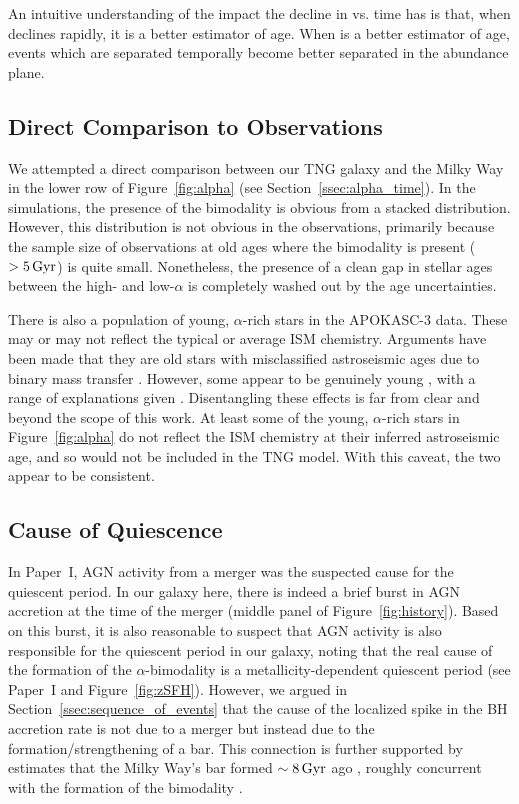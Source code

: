 An intuitive understanding of the impact the decline in \alphaFe{} vs. time has is that, when \alphaFe{} declines rapidly, it is a better estimator of age. When \alphaFe{} is a better estimator of age, events which are separated temporally become better separated in the abundance plane.

\subsection{Direct Comparison to Observations}\label{ssec:compare_obs}
We attempted a direct comparison between our TNG galaxy and the Milky Way in the lower row of Figure~\ref{fig:alpha} (see Section~\ref{ssec:alpha_time}). In the simulations, the presence of the bimodality is obvious from a stacked distribution. However, this distribution is not obvious in the observations, primarily because the sample size of observations at old ages where the bimodality is present ($>5\,\textrm{Gyr}$) is quite small. Nonetheless, the presence of a clean gap in stellar ages between the high- and low-$\alpha$ is completely washed out by the age uncertainties.

There is also a population of young, $\alpha$-rich stars in the APOKASC-3 data. These may or may not reflect the typical or average ISM chemistry. Arguments have been made that they are old stars with misclassified astroseismic ages due to binary mass transfer \citep[and references therein]{2023A&A...671A..21J}. However, some appear to be genuinely young \citep[and references therein]{2024arXiv241002962L}, with a range of explanations given \citep[e.g.][]{2015A&A...576L..12C,2021MNRAS.508.4484J,2023arXiv231105815S}. Disentangling these effects is far from clear and beyond the scope of this work. At least some of the young, $\alpha$-rich stars in Figure~\ref{fig:alpha} do not reflect the ISM chemistry at their inferred astroseismic age, and so would not be included in the TNG model. With this caveat, the two appear to be consistent.

\subsection{Cause of Quiescence}\label{ssec:cause_qui}
In Paper~I, AGN activity from a merger was the suspected cause for the quiescent period. In our galaxy here, there is indeed a brief burst in AGN accretion at the time of the merger (middle panel of Figure~\ref{fig:history}). Based on this burst, it is also reasonable to suspect that AGN activity is also responsible for the quiescent period in our galaxy, noting that the real cause of the formation of the $\alpha$-bimodality is a metallicity-dependent quiescent period (see Paper~I and Figure~\ref{fig:zSFH}). However, we argued in Section~\ref{ssec:sequence_of_events} that the cause of the localized spike in the BH accretion rate is not due to a merger but instead due to the formation/strengthening of a bar. This connection is further supported by estimates that the Milky Way's bar formed $\sim8\,\textrm{Gyr}$ ago \citep[e.g.,][]{2019MNRAS.490.4740B,2024MNRAS.530.2972S}, roughly concurrent with the formation of the bimodality \citep{2013A&A...560A.109H,2023MNRAS.525.2208R,2024MNRAS.535..392L}.

